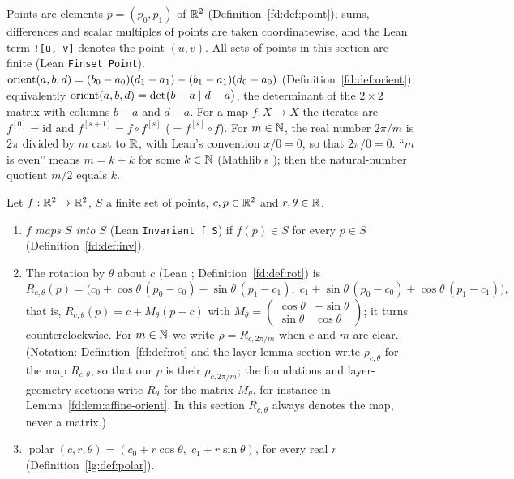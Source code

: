Points are elements $p=(p_0,p_1)$ of $\mathbb R^2$ (Definition~\ref{fd:def:point}); sums, differences and scalar multiples
of points are taken coordinatewise, and the Lean term \texttt{![u, v]} denotes the point $(u,v)$. All sets
of points in this section are finite (Lean \texttt{Finset Point}).
$\operatorname{orient}(a,b,d)=(b_0-a_0)(d_1-a_1)-(b_1-a_1)(d_0-a_0)$ (Definition~\ref{fd:def:orient}); equivalently
$\operatorname{orient}(a,b,d)=\det\bigl(b-a\mid d-a\bigr)$, the determinant of the $2\times2$ matrix with columns $b-a$
and $d-a$. For a map $f:X\to X$ the iterates are $f^{[0]}=\mathrm{id}$ and
$f^{[s+1]}=f\circ f^{[s]}$ ($=f^{[s]}\circ f$). For $m\in\mathbb N$, the real number $2\pi/m$ is $2\pi$ divided
by $m$ cast to $\mathbb R$, with Lean's convention $x/0=0$, so that $2\pi/0=0$. ``$m$ is even'' means $m=k+k$
for some $k\in\mathbb N$ (Mathlib's ); then the natural-number quotient $m/2$ equals $k$.

\begin{definition}\label{oc:def:basic}
Let $f:\mathbb R^2\to\mathbb R^2$, $S$ a finite set of points, $c,p\in\mathbb R^2$ and $r,\theta\in\mathbb R$.
\begin{enumerate}[label=(\alph*)]
\item $f$ \emph{maps $S$ into $S$} (Lean \texttt{Invariant f S}) if $f(p)\in S$ for every $p\in S$
  (Definition~\ref{fd:def:inv}).
\item The rotation by $\theta$ about $c$ (Lean ; Definition~\ref{fd:def:rot}) is
  \[R_{c,\theta}(p)=\bigl(c_0+\cos\theta\,(p_0-c_0)-\sin\theta\,(p_1-c_1),\;
     c_1+\sin\theta\,(p_0-c_0)+\cos\theta\,(p_1-c_1)\bigr),\]
  that is, $R_{c,\theta}(p)=c+M_\theta(p-c)$ with $M_\theta=\begin{pmatrix}\cos\theta&-\sin\theta\\
  \sin\theta&\cos\theta\end{pmatrix}$; it turns counterclockwise. For $m\in\mathbb N$ we write
  $\rho=R_{c,2\pi/m}$ when $c$ and $m$ are clear. (Notation: Definition~\ref{fd:def:rot} and the
  layer-lemma section write $\rho_{c,\theta}$ for the map $R_{c,\theta}$, so that our $\rho$ is their
  $\rho_{c,2\pi/m}$; the foundations and layer-geometry sections write $R_\theta$ for the matrix
  $M_\theta$, for instance in Lemma~\ref{fd:lem:affine-orient}. In this section $R_{c,\theta}$ always
  denotes the map, never a matrix.)
\item $\operatorname{polar}(c,r,\theta)=(c_0+r\cos\theta,\;c_1+r\sin\theta)$, for every real $r$
  (Definition~\ref{lg:def:polar}).
\end{enumerate}
\end{definition}

